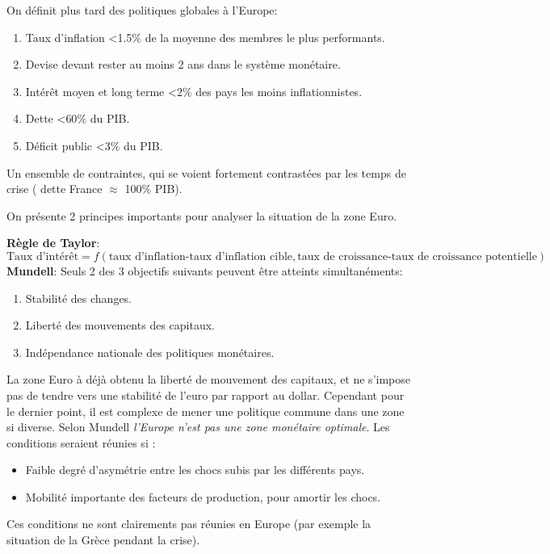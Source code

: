 On définit plus tard des politiques globales à l'Europe: 
\begin{enumerate}
	\item Taux d'inflation <1.5$\%$ de la moyenne des membres le plus performants.
	\item Devise devant rester au moins 2 ans dans le système monétaire.
	\item Intérêt moyen et long terme <$2\%$ des pays les moins inflationnistes.
	\item Dette <$60\%$ du PIB.
	\item Déficit public <$3\%$ du PIB.
	
\end{enumerate}

Un ensemble de contraintes, qui se voient fortement contrastées par les temps de crise ( dette France $\approx$ 100$\%$ PIB).

On présente 2 principes importants pour analyser la situation de la zone Euro. 
\newline

\textbf{Règle de Taylor}: 	
\[
	\text{Taux d'intérêt}= f(\text{taux d'inflation-taux d'inflation cible},\text{taux de croissance-taux de croissance potentielle})
\]
\textbf{Mundell}: Seuls 2 des 3 objectifs suivants peuvent être atteints simultanéments: 
\begin{enumerate}
	\item Stabilité des changes.
	\item Liberté des mouvements des capitaux.
	\item Indépendance nationale des politiques monétaires. 
\end{enumerate}

La zone Euro à déjà obtenu la liberté de mouvement des capitaux, et ne s'impose pas de tendre vers une stabilité de l'euro par rapport au dollar. Cependant pour le
dernier point, il est complexe de mener une politique commune dans une zone si diverse. Selon Mundell \emph{l'Europe n'est pas une zone monétaire optimale}.
Les conditions seraient réunies si : 
\begin{itemize}
	\item Faible degré d'asymétrie entre les chocs subis par les différents pays.
	\item Mobilité importante des facteurs de production, pour amortir les chocs. 
\end{itemize}
Ces conditions ne sont clairements pas réunies en Europe (par exemple la situation de la Grèce pendant la crise).

